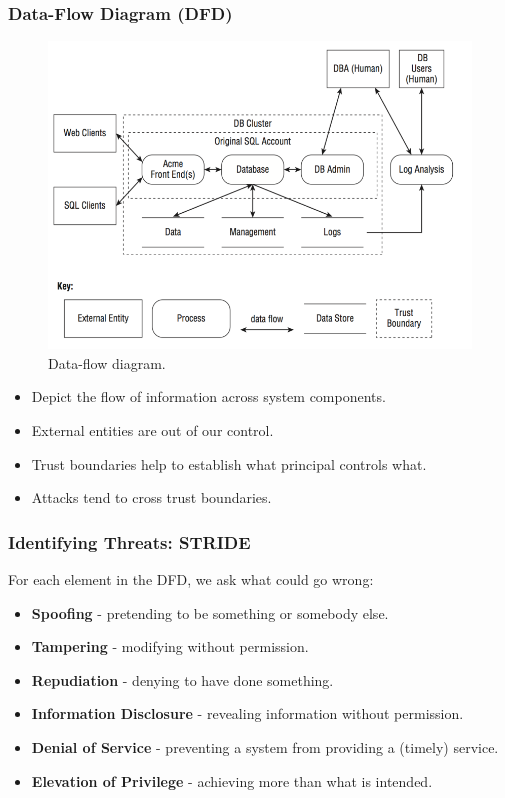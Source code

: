 \documentclass[11pt]{article}
\begin{document}
\subsubsection{Data-Flow Diagram (DFD)}
\begin{figure}[htb!]
  \centering
  \caption{Data-flow diagram.}
  \includegraphics[scale=0.3]{dfd}
\end{figure}
\begin{itemize}
  \item Depict the flow of information across system components.
  \item External entities are out of our control.
  \item Trust boundaries help to establish what principal controls what.
  \item Attacks tend to cross trust boundaries.
\end{itemize}

\subsubsection{Identifying Threats: STRIDE}
For each element in the DFD, we ask what could go wrong:
\begin{itemize}
  \item \textbf{Spoofing} - pretending to be something or somebody else.
  \item \textbf{Tampering} - modifying without permission.
  \item \textbf{Repudiation} - denying to have done something.
  \item \textbf{Information Disclosure} - revealing information without permission.
  \item \textbf{Denial of Service} - preventing a system from providing a (timely) service.
  \item \textbf{Elevation of Privilege} - achieving more than what is intended.
\end{itemize}
\end{document}

